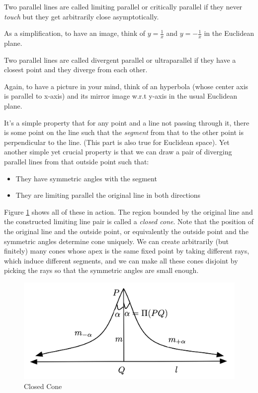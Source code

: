 \begin{definition}
Two parallel lines are called limiting parallel or critically parallel if they never \textit{touch} but they get arbitrarily close asymptotically.
\end{definition}

As a simplification, to have an image, think of $y = \frac{1}{x}$ and $y = -\frac{1}{x}$ in the Euclidean plane.

\begin{definition}
Two parallel lines are called divergent parallel or ultraparallel if they have a closest point and they diverge from each other.
\end{definition}

Again, to have a picture in your mind, think of an hyperbola (whose center axis is parallel to x-axis) and its mirror image w.r.t y-axis in the usual Euclidean plane.

It's a simple property that for any point and a line not passing through it, there is some point on the line such that the \textit{segment} from that to the other point is perpendicular to the line. (This part is also true for Euclidean space). Yet another simple yet crucial property is that we can draw a pair of diverging parallel lines from that outside point such that:

\begin{itemize}
    \item They have symmetric angles with the segment
    \item They are limiting parallel the original line in both directions
\end{itemize}

Figure \ref{fig:cone} shows all of these in action. The region bounded by the original line and the constructed limiting line pair is called a \textit{closed cone}. Note that the position of the original line and the outside point, or equivalently the outside point and the symmetric angles determine cone uniquely. We can create arbitrarily (but finitely) many cones whose apex is the same fixed point by taking different rays, which induce different segments, and we can make all these cones disjoint by picking the rays so that the symmetric angles are small enough.

\begin{figure}
    \centering
    \includegraphics[width=.7\textwidth]{chapter_16/files/cone.png}
    \caption{Closed Cone}
    \label{fig:cone}
\end{figure}

